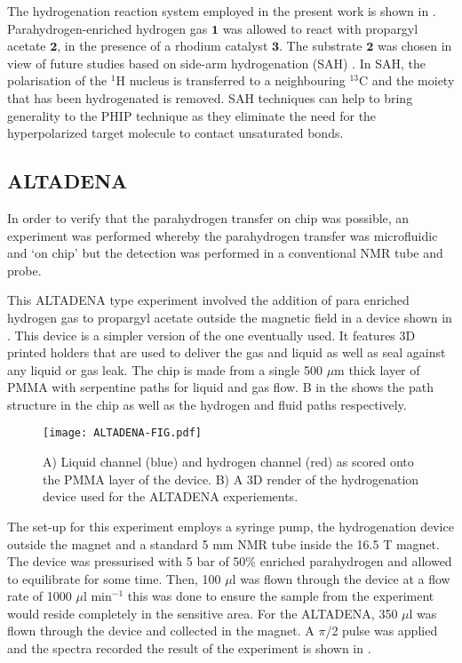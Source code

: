 The hydrogenation reaction system employed in the present work is shown in
.
Para\-hydrogen-en\-riched hydrogen gas $\mathbf{1}$ was
allowed to react with propargyl acetate $\mathbf{2}$, in the presence of
a rhodium catalyst $\mathbf{3}$. The substrate $\mathbf{2}$ was chosen in
view of future studies based on side-arm hydrogenation (SAH)
\cite{Reineri:2015he,cavallari201813,cavallari2015effects}. In SAH, the
polarisation of the $^1$H nucleus is transferred to a neighbouring $^13$C
and the moiety that has been hydrogenated is removed. SAH techniques can
help to bring generality to the PHIP technique as they eliminate the need for
the hyperpolarized target molecule to contact unsaturated bonds.

\subsection{ALTADENA}

In order to verify that the parahydrogen transfer on chip was possible, an
experiment was performed whereby the parahydrogen transfer was microfluidic
and ‘on chip’ but the detection was performed in a conventional NMR tube and probe.

This ALTADENA type experiment involved the addition of para enriched hydrogen
gas to propargyl acetate outside the magnetic field in a device shown in . This device
is a simpler version of the one eventually used.
It features 3D printed holders that are used to deliver the gas and liquid as
well as seal against any liquid or gas leak. The chip is made from a single 500
$\mu$m thick layer of PMMA with serpentine paths for liquid and gas flow. B in the
 shows the path structure in the chip as well as the hydrogen and fluid paths
respectively.

\begin{figure}[ht]
  \begin{center}
  \texttt{[image: ALTADENA-FIG.pdf]}
  \end{center}
  \caption{A) Liquid channel (blue) and hydrogen channel (red) as scored
  onto the PMMA layer of the device. B) A 3D render of the hydrogenation device
  used for the ALTADENA experiements.}
  \label{fig:AltadenaChip}
\end{figure}

The set-up for this experiment employs a syringe pump, the hydrogenation device
outside the magnet and a standard 5 mm NMR tube inside the 16.5 T magnet. The device
was pressurised with 5 bar of 50\% enriched parahydrogen and allowed to equilibrate
for some time. Then, 100 $\mu$l was flown through the device at a flow rate of 1000
$\mu$l min$^{-1}$ this was done to ensure the sample from the experiment would reside
completely in the sensitive area. For the ALTADENA, 350 $\mu$l was flown through
the device and collected in the magnet. A $\pi$/2 pulse was applied and the spectra
recorded the result of the experiment is shown in .


